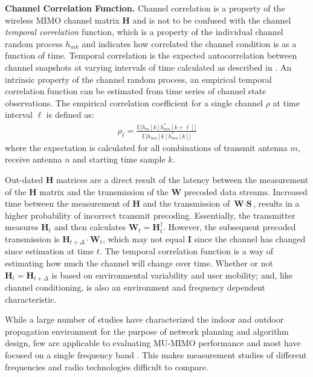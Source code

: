 \textbf{Channel Correlation Function.}
	Channel correlation is a property of the wireless \ac{MIMO} channel matrix $\textbf{H}$ and is not to be confused with the channel \emph{temporal correlation} function, which is a property of the individual channel random process $h_{mk}$ and indicates how correlated the channel condition is as a function of time.
	Temporal correlation is the expected autocorrelation between channel snapshots at varying intervals of time calculated as described in \cite{wallace2003experimental}.
	An intrinsic property of the channel random process, an empirical temporal correlation function can be estimated from time series of channel state observations.
	The empirical correlation coefficient for a single channel $\rho$ at time interval $\ell$ is defined as:
\begin{align}
\rho_\ell = \frac{\mathbb{E}\big[h_{m}[k]h^{*}_{mn}[k+\ell]\big]}{\mathbb{E}\big[h_{mn}[k]h^{*}_{mn}[k]\big]}
\label{eq_corr_coeff}
\end{align}
where the expectation is calculated for all combinations of transmit antenna $m$, receive antenna $n$ and starting time sample $k$.

	Out-dated $\textbf{H}$ matrices are a direct result of the latency between the measurement of the $\textbf{H}$ matrix and the transmission of the $\textbf{W}$ precoded data streams.  
	Increased time between the measurement of $\textbf{H}$ and the transmission of $\textbf{W}\cdot \textbf{S}$, results in a higher probability of incorrect transmit precoding.  
	Essentially, the transmitter measures $\textbf{H}_{t}$ and then calculates $\textbf{W}_t = \textbf{H}_t^\dagger$.
However, the subsequent precoded transmission is $\textbf{H}_{t+\Delta}\cdot \textbf{W}_{t}$, which may not equal $\textbf{I}$ since the channel has changed since estimation at time $t$.
	The temporal correlation function is a way of estimating how much the channel will change over time.
	Whether or not $\textbf{H}_{t}=\textbf{H}_{t+\Delta}$ is based on environmental variability and user mobility; and, like channel conditioning, is also an environment and frequency dependent characteristic. 

	While a large number of studies have characterized the indoor and outdoor propagation environment for the purpose of network planning and algorithm design, few are applicable to evaluating \ac{MU-MIMO} performance and most have focused on a single frequency band \cite{boyer2007mimo, hammons2008cooperative, jung2011multipath}.
	This makes measurement studies of different frequencies and radio technologies difficult to compare.

